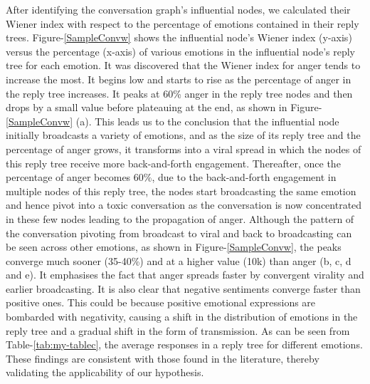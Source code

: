 \documentclass[acmtog]{acmart}
\begin{document}
After identifying the conversation graph's influential nodes, we calculated their Wiener index with respect to the percentage of emotions contained in their reply trees. Figure-\ref{SampleConvw} shows the influential node's Wiener index (y-axis) versus the percentage (x-axis) of various emotions in the influential node's reply tree for each emotion. It was discovered that the Wiener index for anger tends to increase the most. It begins low and starts to rise as the percentage of anger in the reply tree increases. It peaks at 60\% anger in the reply tree nodes and then drops by a small value before plateauing at the end, as shown in Figure-\ref{SampleConvw} (a). This leads us to the conclusion that the influential node initially broadcasts a variety of emotions, and as the size of its reply tree and the percentage of anger grows, it transforms into a viral spread in which the nodes of this reply tree receive more back-and-forth engagement. Thereafter, once the percentage of anger becomes 60\%, due to the back-and-forth engagement in multiple nodes of this reply tree, the nodes start broadcasting the same emotion and hence pivot into a toxic conversation as the conversation is now concentrated in these few nodes leading to the propagation of anger. Although the pattern of the conversation pivoting from broadcast to viral and back to broadcasting can be seen across other emotions, as shown in Figure-\ref{SampleConvw}, the peaks converge much sooner (35-40\%) and at a higher value (10k) than anger (b, c, d and e). It emphasises the fact that anger spreads faster by convergent virality and earlier broadcasting. It is also clear that negative sentiments converge faster than positive ones. This could be because positive emotional expressions are bombarded with negativity, causing a shift in the distribution of emotions in the reply tree and a gradual shift in the form of transmission. As can be seen from Table-\ref{tab:my-tablec}, the average responses in a reply tree for different emotions. These findings are consistent with those found in the literature, thereby validating the applicability of our hypothesis.
\end{document}
